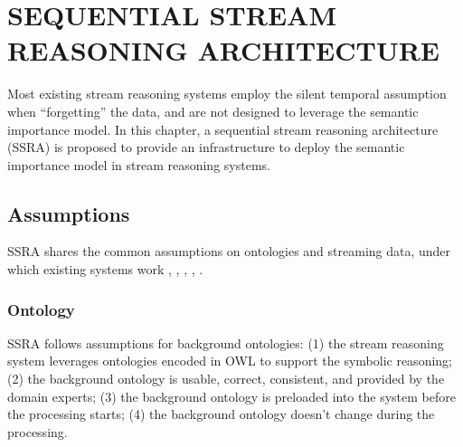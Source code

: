  
\chapter{SEQUENTIAL STREAM REASONING ARCHITECTURE}
Most existing stream reasoning systems employ the silent temporal assumption when ``forgetting'' the data, and are not designed to leverage the semantic importance model.
In this chapter, a sequential stream reasoning architecture (SSRA) is proposed to provide an infrastructure to deploy the semantic importance model in stream reasoning systems.

\section{Assumptions}
SSRA shares the common assumptions on ontologies and streaming data, under which existing systems work \cite{barbieri2009c}, \cite{barbieri2010c}, \cite{barbieri2010execution}, \cite{barbieri2010incremental}, \cite{anicic2011ep}.
%
\subsection{Ontology}
SSRA follows assumptions for background ontologies:
(1) the stream reasoning system leverages ontologies encoded in OWL \cite{mcguinness2004owl} to support the symbolic reasoning; 
(2) the background ontology is usable, correct, consistent, and provided by the domain experts;
(3) the background ontology is preloaded into the system before the processing starts;
(4) the background ontology doesn't change during the processing. 

